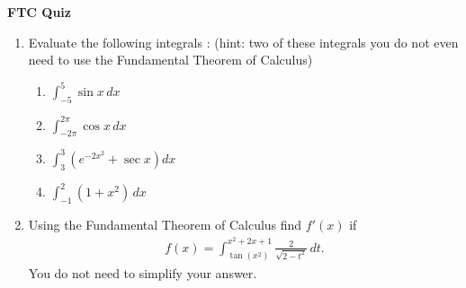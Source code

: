 \documentclass[11pt]{article}
\begin{document}

\centerline{\textbf{\Large{FTC Quiz}}}

\vspace{0.2in}
 
\begin{enumerate}
\item Evaluate the following integrals : (hint: two of these integrals you do not even need to use the Fundamental Theorem of Calculus)
\begin{enumerate}
	\item $\int_{-5}^{5} \sin x \, dx$
	\item $\int_{-2\pi}^{2\pi} \cos x \, dx$
	\item $\int_{3}^{3} (e^{-2x^{2}} + \sec x) dx$
	\item $\int_{-1}^{2} (1 + x^2) \, dx$
\end{enumerate} 
\item Using the Fundamental Theorem of Calculus find $f'(x)$ if 
\begin{align*}
	f(x) = \int_{\tan (x^2)}^{x^2 + 2x + 1} \frac{2}{\sqrt{2 - t^2 }} \, dt.
\end{align*}
You do not need to simplify your answer.
\end{enumerate}
\end{document}
